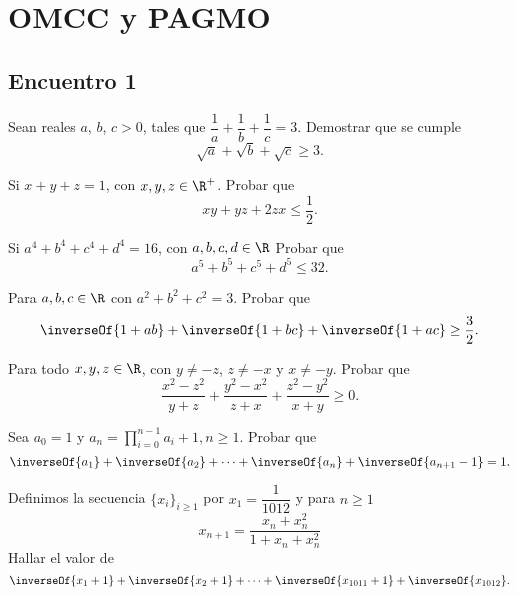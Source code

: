\section{OMCC y PAGMO}

\subsection{Encuentro 1}

\begin{section-problem}
    Sean reales $a$, $b$, $c > 0$, tales que $\dfrac{1}{a} + \dfrac{1}{b} + \dfrac{1}{c} = 3$.
    Demostrar que se cumple
    \[\sqrt {a} + \sqrt {b} + \sqrt {c} \geq 3.\]
\end{section-problem}

\begin{section-problem}
    Si $x + y + z = 1$, con $x, y, z \in \R^+$.
    Probar que
    \[xy + yz + 2zx \leq \frac{1}{2}.\]
\end{section-problem}

\begin{section-problem}
    Si $a^4 + b^4 + c^4 + d^4 = 16$, con $a, b, c, d \in \R$
    Probar que
    \[a^5 + b^5 + c^5 + d^5 \leq 32.\]
\end{section-problem}

\begin{section-problem}
    Para $a, b, c \in \R$ con $a^2 + b^2 + c^2 = 3$.
    Probar que
    \[\inverseOf{1 + ab} + \inverseOf{1 + bc} + \inverseOf{1 + ac} \geq \frac{3}{2}.\]
\end{section-problem}

\begin{section-problem}
    Para todo $x, y, z \in \R$, con $y \neq - z$, $z \neq - x$ y $x \neq - y$.
    Probar que
    \[\frac{x^2 - z^2}{y + z} + \frac{y^2 - x^2}{z + x} + \frac{z^2 - y^2}{x + y} \geq 0.\]
\end{section-problem}

\begin{section-problem}
    Sea $a_0 = 1$ y $a_n = \displaystyle\prod_{i = 0}^{n - 1} a_i + 1, n \geq 1$.
    Probar que
    \[\inverseOf{a_1} + \inverseOf{a_2} + \cdots + \inverseOf{a_n} + \inverseOf{a_{n + 1} - 1} = 1.\]
\end{section-problem}

\begin{section-problem}
    Definimos la secuencia $\{x_i\}_{i \geq 1}$ por $x_1 = \dfrac{1}{1012}$ y para $n \geq 1$
    \[x_{n + 1} = \frac{x_n + x_n^2}{1 + x_n + x_n^2}\]
    Hallar el valor de
    \[\inverseOf{x_1 + 1} + \inverseOf{x_2 + 1} + \cdots + \inverseOf{x_{1011} + 1} + \inverseOf{x_{1012}}.\]
\end{section-problem}


